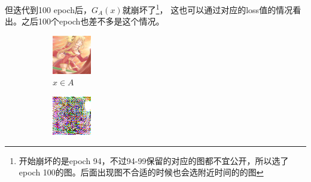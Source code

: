 \documentclass[twocolumn,11pt]{ctexart}
\begin{document}
但迭代到100 epoch后，$G_A(x)$就崩坏了\footnote{开始崩坏的是epoch 94，不过94-99保留的对应的图都不宜公开，所以选了
epoch 100的图。后面出现图不合适的时候也会选附近时间的的图}，
这也可以通过对应的loss值的情况看出。之后100个epoch也差不多是这个情况。

\begin{figure}[htb]
    \centering
    \begin{subfigure}[b]{0.23\linewidth}
        \includegraphics[width=\linewidth]{exp2_epoch100_real_A.png}
        \caption{$x \in A$}
      \end{subfigure}
      \begin{subfigure}[b]{0.23\linewidth}
        \includegraphics[width=\linewidth]{exp2_epoch100_fake_B.png}

\end{subfigure}
\end{figure}
\end{document}
